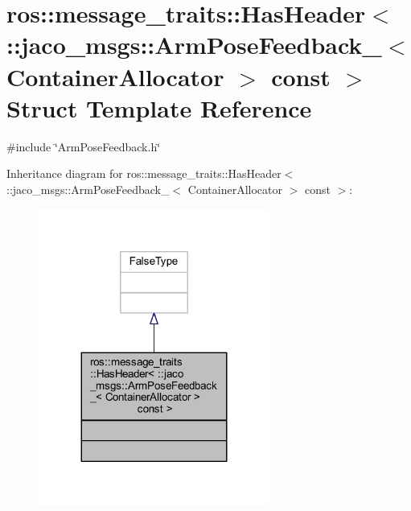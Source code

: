 \hypertarget{structros_1_1message__traits_1_1HasHeader_3_01_1_1jaco__msgs_1_1ArmPoseFeedback___3_01ContainerAllocator_01_4_01const_01_01_4}{}\section{ros\+:\+:message\+\_\+traits\+:\+:Has\+Header$<$ \+:\+:jaco\+\_\+msgs\+:\+:Arm\+Pose\+Feedback\+\_\+$<$ Container\+Allocator $>$ const $>$ Struct Template Reference}
\label{structros_1_1message__traits_1_1HasHeader_3_01_1_1jaco__msgs_1_1ArmPoseFeedback___3_01ContainerAllocator_01_4_01const_01_01_4}


{\ttfamily \#include \char`\"{}Arm\+Pose\+Feedback.\+h\char`\"{}}



Inheritance diagram for ros\+:\+:message\+\_\+traits\+:\+:Has\+Header$<$ \+:\+:jaco\+\_\+msgs\+:\+:Arm\+Pose\+Feedback\+\_\+$<$ Container\+Allocator $>$ const $>$\+:
\nopagebreak
\begin{figure}[H]
\begin{center}
\leavevmode
\includegraphics[width=215pt]{d5/d41/structros_1_1message__traits_1_1HasHeader_3_01_1_1jaco__msgs_1_1ArmPoseFeedback___3_01ContainerAf144af3e30c994b047ea06e1ffff63da}
\end{center}
\end{figure}


